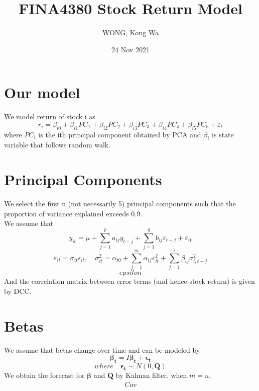 \documentclass{article}
\title{FINA4380 Stock Return Model}
\author{WONG, Kong Wa}
\date{24 Nov 2021}
\begin{document}
\maketitle
\raggedright
\section{Our model}
We model return of stock i as
\begin{equation*}
	r_i=\beta_{i0}+\beta_{i1}PC_1+\beta_{i2}PC_2+\beta_{i3}PC_3+\beta_{i4}PC_4+\beta_{i5}PC_5+\varepsilon_t
\end{equation*}
where $PC_i$ is the ith principal component obtained by PCA and $\beta_i$ is state variable that follows random walk.
\section{Principal Components}
We select the first n (not necessarily 5) principal components such that the proportion of variance explained exceeds 0.9. \\
We assume that
\begin{equation*}
	y_{it}=\mu+\sum_{j=1}^p a_{ij} y_{t-j}+\sum_{j=1}^q b_{ij} \varepsilon_{t-j}+\varepsilon_{it}
\end{equation*}
\begin{equation*}
	\varepsilon_{it}=\sigma_{it} \epsilon_{it}, \quad \sigma_{it}^2=\alpha_{i0}+\sum_{j=1}^m \alpha_{ij} \varepsilon_{it}^2+\sum_{j=1}^s \beta_{ij} \sigma_{i,t-j}^2
\end{equation*}
\begin{equation*}
    epsilon
\end{equation*}
And the correlation matrix between error terms (and hence stock return) is given by DCC.
\section{Betas}
We assume that betas change over time and can be modeled by
\begin{equation*}
    \mathbf{\beta_t} = I\mathbf{\beta_t}+\mathbf{\epsilon_t}
\end{equation*}
\begin{equation*}
    where \quad \mathbf{\epsilon_t} \sim N(0,\mathbf{Q})
\end{equation*}
We obtain the forecast for $\mathbf{\beta}$ and $\mathbf{Q}$ by Kalman filter.
when $m=n$,
\begin{align*}
    Cov
\end{align*}
\end{document}
